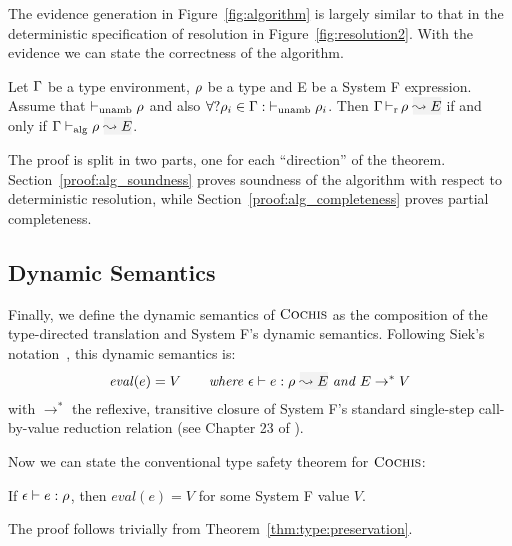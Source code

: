 The evidence generation in Figure~\ref{fig:algorithm} is largely similar to
that in the deterministic specification of resolution in
Figure~\ref{fig:resolution2}.
With the evidence we can state the correctness of the algorithm.

% 

\begin{theorem}
Let $\Gamma$ be a type environment, $\rho$ be a type and E be a System F expression.
Assume that ${ \vdash_{\mathrm{unamb}} \rho}$ and also $\forall ?\rho_i \in \Gamma: { \vdash_{\mathrm{unamb}} \rho_i}$.
Then $\dres{\tenv}{\rulet}{E}$ if and only if $\adres{\tenv}{\rulet}{E}$.
\end{theorem}
The proof is split in two parts, one for each ``direction'' of the theorem.
Section~\ref{proof:alg_soundness} proves
soundness of the algorithm with respect to deterministic resolution, while Section~\ref{proof:alg_completeness} proves partial completeness.

\subsection{Dynamic Semantics}
Finally, we define the dynamic semantics of $\textsc{Cochis}$ as the composition of
the type-directed translation and System F's dynamic semantics.  Following
Siek's notation~\cite{systemfg}, this dynamic semantics is:
\[ \mathit{eval}(e) = V \quad\quad \textit{where } \wte{\epsilon}{e}{\rulet}{E} \textit{ and } E \rightarrow^* V  \]
with $\rightarrow^*$ the reflexive, transitive closure of System F's standard single-step call-by-value reduction relation (see Chapter 23 of \cite{tapl}).

Now we can state the conventional type safety theorem for $\textsc{Cochis}$:
\begin{theorem}
If ${\epsilon \vdash e:\rho}$, then $\mathit{eval}(e) = V$ for
some System F value $V$.
\end{theorem}
The proof follows trivially from Theorem~\ref{thm:type:preservation}.


